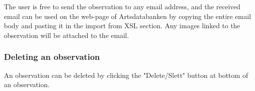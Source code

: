 The user is free to send the observation to any email address, and the received
email can be used on the web-page of Artsdatabanken by copying the entire email
body and pasting it in the import from XSL section.
Any images linked to the observation will be attached to the email.

\subsubsection{Deleting an observation}
An observation can be deleted by clicking the "Delete/Slett" button at bottom of an observation.
